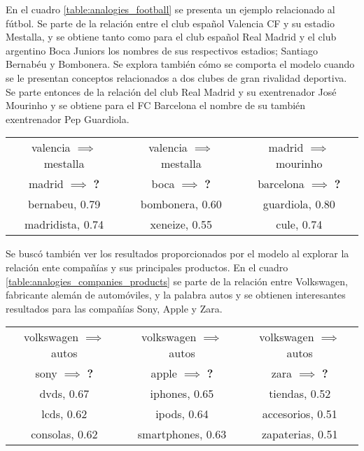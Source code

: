 En el cuadro \ref{table:analogies_football} se presenta un ejemplo relacionado al fútbol. Se
parte de la relación entre el club español Valencia CF y su estadio Mestalla, y se obtiene tanto
como para el club español Real Madrid y el club argentino Boca Juniors los nombres de sus
respectivos estadios; Santiago Bernabéu y Bombonera. Se explora también cómo se
comporta el modelo cuando se le presentan conceptos relacionados a dos clubes de gran
rivalidad deportiva. Se parte entonces de la relación del club Real Madrid y su exentrenador
José Mourinho y se obtiene para el FC Barcelona el nombre de su también exentrenador Pep
Guardiola.

\begin{table*}[ht]
    \centering
    \begin{tabular}{|c|c|c|}
        \hline
        valencia $\implies$ mestalla & valencia $\implies$ mestalla & madrid $\implies$ mourinho\\
        madrid $\implies$ \textbf{?} & boca $\implies$ \textbf{?} & barcelona $\implies$ \textbf{?}\\
        \hline
        bernabeu, 0.79 & bombonera, 0.60 & guardiola, 0.80\\
        madridista, 0.74 & xeneize, 0.55 & cule, 0.74\\
        \hline
    \end{tabular}
    \caption{Analogías relacionadas al fútbol.}
    \label{table:analogies_football}
\end{table*}

Se buscó también ver los resultados proporcionados por el modelo al explorar la relación
ente compañías y sus principales productos. En el cuadro
\ref{table:analogies_companies_products} se parte de la relación entre Volkswagen, fabricante
alemán de automóviles, y la palabra autos y se obtienen interesantes resultados para las
compañías Sony, Apple y Zara.

\begin{table*}[ht]
    \centering
    \begin{tabular}{|c|c|c|}
        \hline
        volkswagen $\implies$ autos & volkswagen $\implies$ autos & volkswagen $\implies$ autos\\
        sony $\implies$ \textbf{?} & apple $\implies$ \textbf{?} & zara $\implies$ \textbf{?}\\
        \hline
        dvds, 0.67 & iphones, 0.65 & tiendas, 0.52\\
        lcds, 0.62 & ipods, 0.64 & accesorios, 0.51\\
        consolas, 0.62 & smartphones, 0.63 & zapaterias, 0.51\\
        \hline
    \end{tabular}
    \caption{Analogías relacionadas a marcas y sus productos.}
    \label{table:analogies_companies_products}
\end{table*}

